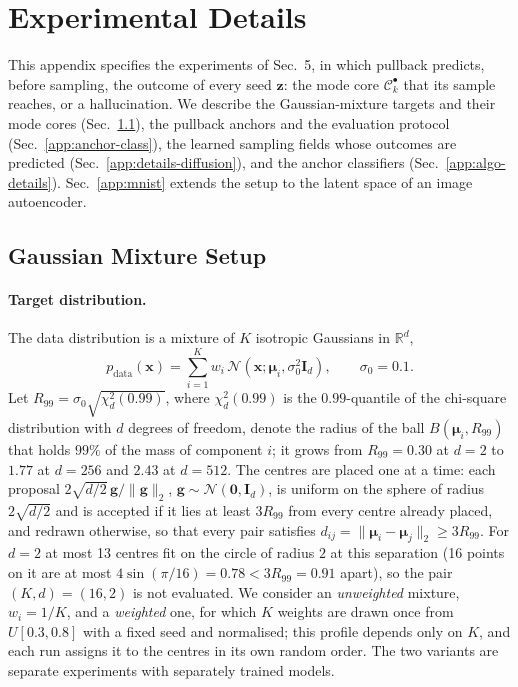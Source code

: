 \section{Experimental Details}
\label{app:experimental_details}

This appendix specifies the experiments of Sec.~5, in which pullback predicts, before sampling,
the outcome of every seed $\boldsymbol{z}$: the mode core $\mathcal{C}_k^\bullet$ that its sample
reaches, or a hallucination. We describe the Gaussian-mixture targets and their mode cores
(Sec.~\ref{app:details_gmm}), the pullback anchors and the evaluation protocol
(Sec.~\ref{app:anchor-class}), the learned sampling fields whose outcomes are predicted
(Sec.~\ref{app:details-diffusion}), and the anchor classifiers (Sec.~\ref{app:algo-details}).
Sec.~\ref{app:mnist} extends the setup to the latent space of an image autoencoder.


\subsection{Gaussian Mixture Setup}
\label{app:details_gmm}

\paragraph{Target distribution.}
The data distribution is a mixture of $K$ isotropic Gaussians in $\mathbb{R}^d$,
\begin{equation}
    p_{\text{data}}(\boldsymbol{x}) = \sum_{i=1}^{K} w_i \, \mathcal{N}(\boldsymbol{x}; \boldsymbol{\mu}_i, \sigma_0^2 \boldsymbol{I}_d),
    \qquad \sigma_0 = 0.1 .
\end{equation}
Let $R_{99} = \sigma_0 \sqrt{\chi^2_d(0.99)}$, where $\chi^2_d(0.99)$ is the $0.99$-quantile of the
chi-square distribution with $d$ degrees of freedom, denote the radius of the ball
$B(\boldsymbol{\mu}_i, R_{99})$ that holds $99\%$ of the mass of component $i$; it grows from
$R_{99} = 0.30$ at $d = 2$ to $1.77$ at $d = 256$ and $2.43$ at $d = 512$. The centres are placed
one at a time: each proposal $2\sqrt{d/2}\,\boldsymbol{g}/\|\boldsymbol{g}\|_2$,
$\boldsymbol{g} \sim \mathcal{N}(\boldsymbol{0}, \boldsymbol{I}_d)$, is uniform on the sphere of
radius $2\sqrt{d/2}$ and is accepted if it lies at least $3R_{99}$ from every centre already
placed, and redrawn otherwise, so that every pair satisfies
$d_{ij} = \|\boldsymbol{\mu}_i - \boldsymbol{\mu}_j\|_2 \ge 3R_{99}$. For $d = 2$ at most 13 centres
fit on the circle of radius $2$ at this separation (16 points on it are at most
$4\sin(\pi/16) = 0.78 < 3R_{99} = 0.91$ apart), so the pair $(K, d) = (16, 2)$ is not evaluated.
We consider an \emph{unweighted} mixture, $w_i = 1/K$, and a \emph{weighted} one, for which $K$
weights are drawn once from $U[0.3, 0.8]$ with a fixed seed and normalised; this profile depends
only on $K$, and each run assigns it to the centres in its own random order. The two variants are
separate experiments with separately trained models.

